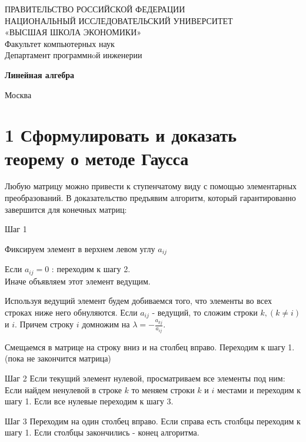 \documentclass[a4paper,12pt]{article}
\newenvironment{my_enumerate}{
\begin{enumerate}
  \setlength{\itemsep}{1pt}
  \setlength{\parskip}{0pt}
  \setlength{\parsep}{0pt}}{\end{enumerate}
}
\begin{document}

\begin{titlepage}
\begin{center}
\vspace*{0.7cm}
{\large ПРАВИТЕЛЬСТВО РОССИЙСКОЙ ФЕДЕРАЦИИ \\
НАЦИОНАЛЬНЫЙ ИССЛЕДОВАТЕЛЬСКИЙ УНИВЕРСИТЕТ \\
«ВЫСШАЯ ШКОЛА ЭКОНОМИКИ» }\\
\vspace*{0.2cm}
Факультет компьютерных наук \\
\smallskip
{\small Департамент программнoй инженерии \\
}
\vspace{1cm}

{\textbf{Линейная алгебра}} \\
\medskip

Москва \number\year \\
\end{center}
\end{titlepage}

\newpage

\newpage
\tableofcontents
{}

\newpage

\section{1 Сформулировать и доказать теорему о методе Гаусса}
Любую матрицу можно привести к ступенчатому виду с помощью элементарных преобразований.
В доказательство предъявим алгоритм, который гарантированно завершится для конечных матриц:
\begin{my_enumerate}
\item[Шаг 1]
\begin{my_enumerate}
\item Фиксируем элемент в верхнем левом углу $ a_{ij} $
\item Если $a_{ij} = 0$ : переходим к шагу 2. \\
Иначе объявляем этот элемент ведущим.
\item Используя ведущий элемент будем добиваемся того, что элементы во всех строках ниже него обнуляются. Если $ a_{ij} $ - ведущий, то сложим строки $ k, ( k \neq i ) $ и $i$. Причем строку $i$ домножим на $ \lambda = - \frac{a_{kj}}{a_{ij}}$.
\item Смещаемся в матрице на строку вниз и на столбец вправо. Переходим к шагу 1. (пока не закончится матрица)
\end{my_enumerate}

\item[Шаг 2] Если текущий элемент нулевой, просматриваем все элементы под ним: Если найдем ненулевой в строке $k$ то меняем строки $k$ и $i$ местами и переходим к шагу 1. Если все нулевые переходим к шагу 3.

\item[Шаг 3] Переходим на один столбец вправо. Если справа есть столбцы переходим к шагу 1. Если столбцы закончились - конец алгоритма. 

\end{my_enumerate}
\end{document}
